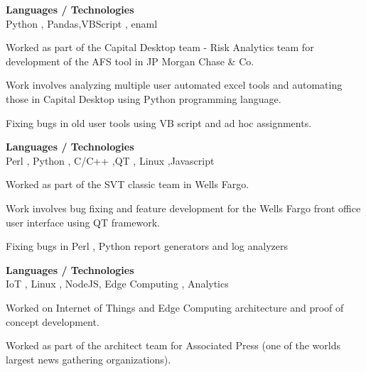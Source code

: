 \documentclass[a4,10pt]{cv4tw}
\begin{document}
                            {\textbf{Languages / Technologies} \\Python , Pandas,VBScript , enaml }
                            {
                                \begin{missions}
                                \item Worked as part of the Capital Desktop team - Risk Analytics team for development of the AFS tool in JP Morgan Chase \& Co.
                                \item Work involves analyzing multiple user automated excel tools and automating those in Capital Desktop using Python programming language.
                                \item Fixing bugs in old user tools using VB script and ad hoc assignments.
                                \end{missions}
                                }
                                {\textbf{Languages / Technologies} \\Perl , Python , C/C++ ,QT , Linux ,Javascript}
                                {
                                    \begin{missions}
                                    \item Worked as part of the SVT classic team in Wells Fargo.
                                    \item Work involves bug fixing and feature development for the Wells Fargo front office user interface using QT framework.
                                    \item Fixing bugs in Perl , Python report generators and log analyzers
                                    \end{missions}
                                    }


                                    {\textbf{Languages / Technologies} \\ IoT , Linux , NodeJS, Edge Computing , Analytics }
                                    {
                                        \begin{missions}
                                        \item Worked on Internet of Things and Edge Computing architecture and proof of concept development.
                                        \item Worked as part of the architect team for Associated Press (one of the worlds largest news gathering organizations).
                                        \end{missions}
                                        }
\end{document}
